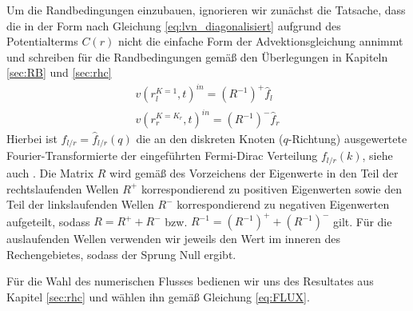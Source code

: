 Um die Randbedingungen einzubauen, ignorieren wir zunächst die Tatsache, dass die \lvn in der Form nach Gleichung \eqref{eq:lvn_diagonalisiert} aufgrund des Potentialterms $C(r)$ nicht die einfache Form der Advektionsgleichung annimmt und schreiben für die Randbedingungen gemäß den Überlegungen in Kapiteln \ref{sec:RB} und \ref{sec:rhc}
\begin{align}
  v(r_l^{K=1}, t)^{in} = (R^{-1})^+ \hat{f}_l  \\
  v(r_r^{K=K_r},t)^{in} = (R^{-1})^- \hat{f}_r
\end{align}
Hierbei ist $\hat{f}_{l/r} = \hat{f}_{l/r}(q)$ die an den diskreten  Knoten ($q$-Richtung) ausgewertete Fourier-Transformierte der eingeführten Fermi-Dirac Verteilung $f_{l/r}(k)$, siehe auch \cite{lukas1}. Die Matrix $R$ wird gemäß des Vorzeichens der Eigenwerte in den Teil der rechtslaufenden Wellen $R^+$ korrespondierend zu positiven Eigenwerten sowie den Teil der linkslaufenden Wellen $R^-$ korrespondierend zu negativen Eigenwerten aufgeteilt, sodass $R=R^+ + R^-$ bzw. $R^{-1} = (R^{-1})^+ + (R^{-1})^-$ gilt. Für die auslaufenden Wellen verwenden wir jeweils den Wert im inneren des Rechengebietes, sodass der Sprung Null ergibt. 

Für die Wahl des numerischen Flusses bedienen wir uns des Resultates aus Kapitel \ref{sec:rhc} und wählen ihn gemäß Gleichung \eqref{eq:FLUX}.
